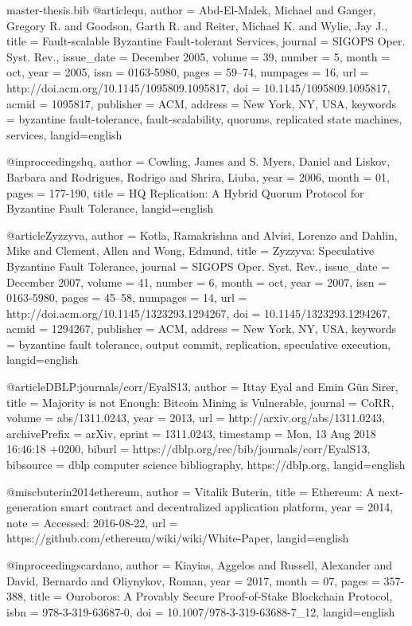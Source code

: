 \begin{filecontents}{master-thesis.bib}
@article{qu,
 author = {Abd-El-Malek, Michael and Ganger, Gregory R. and Goodson, Garth R. and Reiter, Michael K. and Wylie, Jay J.},
 title = {Fault-scalable Byzantine Fault-tolerant Services},
 journal = {SIGOPS Oper. Syst. Rev.},
 issue_date = {December 2005},
 volume = {39},
 number = {5},
 month = oct,
 year = {2005},
 issn = {0163-5980},
 pages = {59--74},
 numpages = {16},
 url = {http://doi.acm.org/10.1145/1095809.1095817},
 doi = {10.1145/1095809.1095817},
 acmid = {1095817},
 publisher = {ACM},
 address = {New York, NY, USA},
 keywords = {byzantine fault-tolerance, fault-scalability, quorums, replicated state machines, services},
 langid={english}
}

@inproceedings{hq,
author = {Cowling, James and S. Myers, Daniel and Liskov, Barbara and Rodrigues, Rodrigo and Shrira, Liuba},
year = {2006},
month = {01},
pages = {177-190},
title = {HQ Replication: A Hybrid Quorum Protocol for Byzantine Fault Tolerance},
 langid={english}
}

@article{Zyzzyva,
 author = {Kotla, Ramakrishna and Alvisi, Lorenzo and Dahlin, Mike and Clement, Allen and Wong, Edmund},
 title = {Zyzzyva: Speculative Byzantine Fault Tolerance},
 journal = {SIGOPS Oper. Syst. Rev.},
 issue_date = {December 2007},
 volume = {41},
 number = {6},
 month = oct,
 year = {2007},
 issn = {0163-5980},
 pages = {45--58},
 numpages = {14},
 url = {http://doi.acm.org/10.1145/1323293.1294267},
 doi = {10.1145/1323293.1294267},
 acmid = {1294267},
 publisher = {ACM},
 address = {New York, NY, USA},
 keywords = {byzantine fault tolerance, output commit, replication, speculative execution},
  langid={english}
} 

@article{DBLP:journals/corr/EyalS13,
  author    = {Ittay Eyal and
               Emin G{\"{u}}n Sirer},
  title     = {Majority is not Enough: Bitcoin Mining is Vulnerable},
  journal   = {CoRR},
  volume    = {abs/1311.0243},
  year      = {2013},
  url       = {http://arxiv.org/abs/1311.0243},
  archivePrefix = {arXiv},
  eprint    = {1311.0243},
  timestamp = {Mon, 13 Aug 2018 16:46:18 +0200},
  biburl    = {https://dblp.org/rec/bib/journals/corr/EyalS13},
  bibsource = {dblp computer science bibliography, https://dblp.org},
   langid={english}
}

@misc{buterin2014ethereum,
  author = {Vitalik Buterin},
  title = {Ethereum: A next-generation smart contract and decentralized application platform},
  year = {2014},
  note = {Accessed: 2016-08-22},
  url = {https://github.com/ethereum/wiki/wiki/White-Paper},
  langid={english}
}

@inproceedings{cardano,
author = {Kiayias, Aggelos and Russell, Alexander and David, Bernardo and Oliynykov, Roman},
year = {2017},
month = {07},
pages = {357-388},
title = {Ouroboros: A Provably Secure Proof-of-Stake Blockchain Protocol},
isbn = {978-3-319-63687-0},
doi = {10.1007/978-3-319-63688-7_12},
 langid={english}
}
\end{filecontents}